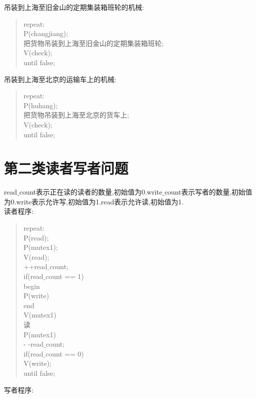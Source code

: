 \documentclass[a4paper,12pt,notitlepage]{article}
\begin{document}
	吊装到上海至旧金山的定期集装箱班轮的机械:
	
\begin{quote}
	repeat: \\
	P(changjiang); \\
	把货物吊装到上海至旧金山的定期集装箱班轮; \\
	V(check); \\
	until false;
\end{quote}

	吊装到上海至北京的运输车上的机械:
	
\begin{quote}
	repeat: \\
	P(huhang); \\
	把货物吊装到上海至北京的货车上; \\
	V(check); \\
	until false;
\end{quote}

\section{第二类读者写者问题}

	read$\_$count表示正在读的读者的数量,初始值为0.write$\_$count表示写者的数量,初始值为0.write表示允许写,初始值为1.read表示允许读,初始值为1. \\
		
	读者程序:
	
\begin{quote}
repeat: \\
	P(read); \\
	P(mutex1); \\
	V(read); \\
	++read$\_$count; \\
	if(read$\_$count == 1) \\
	begin \\
	P(write) \\
	end \\
	V(mutex1) \\
	读 \\
	P(mutex1) \\
	- -read$\_$count; \\
	if(read$\_$count == 0) \\
	V(write); \\
until false;
\end{quote}

	写者程序:
	
\end{document}

